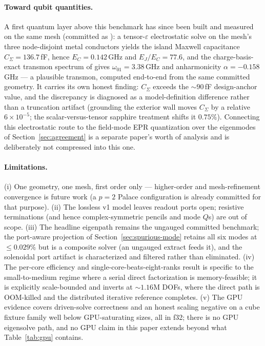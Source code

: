 \documentclass{anvil-paper}
\begin{document}
\paragraph{Toward qubit quantities.}
A first quantum layer above this benchmark has since been built and
measured on the same mesh (committed as
): a tensor-$\varepsilon$
electrostatic solve on the mesh's three node-disjoint metal conductors
yields the island Maxwell capacitance $C_\Sigma = 136.7$\,fF, hence
$E_C = 0.142$\,GHz and $E_J/E_C = 77.6$, and the charge-basis-exact
transmon spectrum of \citet{koch2007} gives $\omega_{01} = 3.38$\,GHz and
anharmonicity $\alpha = -0.158$\,GHz --- a plausible transmon, computed
end-to-end from the same committed geometry. It carries its own honest
finding: $C_\Sigma$ exceeds the ${\sim}90$\,fF design-anchor value, and
the discrepancy is diagnosed as a model-definition difference rather than
a truncation artifact (grounding the exterior wall moves $C_\Sigma$ by a
relative $6\times10^{-5}$; the scalar-versus-tensor sapphire treatment
shifts it $0.75\%$). Connecting this electrostatic route to the
field-mode EPR quantization \citep{minev2021,nigg2012} over the
eigenmodes of Section~\ref{sec:agreement} is a separate paper's worth of
analysis and is deliberately not compressed into this one.

\paragraph{Limitations.}
(i) One geometry, one mesh, first order only --- higher-order and
mesh-refinement convergence is future work (a $p = 2$ Palace
configuration is already committed for that purpose). (ii) The lossless v1
model leaves readout ports open; resistive terminations (and hence
complex-symmetric pencils and mode $Q$s) are out of scope. (iii) The
headline eigenpath remains the ungauged committed benchmark; the
port-aware projection of Section~\ref{sec:spurious-mode} retains all six
modes at $\leq 0.029\%$ but is a composite solver (an ungauged extract
feeds it), and the solenoidal port artifact is characterized and filtered
rather than eliminated. (iv) The per-core efficiency and single-core-beats-eight-ranks result is
specific to the small-to-medium regime where a serial direct
factorization is memory-feasible; it is explicitly scale-bounded and
inverts at ${\sim}1.16$M DOFs, where the direct path is OOM-killed and the
distributed iterative reference completes. (v) The GPU evidence covers driven-solve correctness and an
honest scaling negative on a cube fixture family well below
GPU-saturating sizes, all in f32; there is no GPU eigensolve path, and no
GPU claim in this paper extends beyond what
Table~\ref{tab:gpu} contains.
\end{document}
